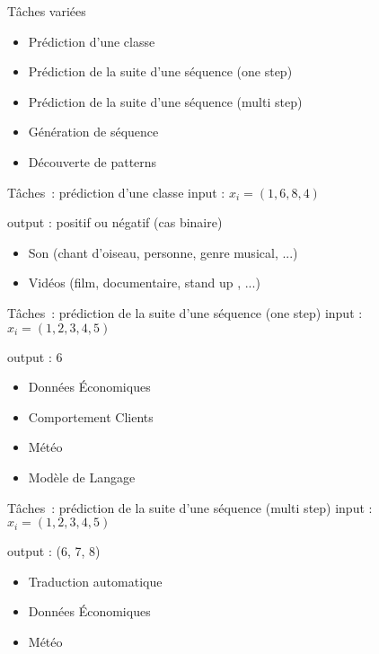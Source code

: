 \begin{frame}{Tâches variées}
  \begin{itemize}
  \item Prédiction d'une classe
  \item Prédiction de la suite d'une séquence (one step)
  \item Prédiction de la suite d'une séquence (multi step)
  \item Génération de séquence
  \item Découverte de patterns
  \end{itemize}
\end{frame}

\begin{frame}{Tâches~: prédiction d'une classe}
  input : $x_i=(1,6,8,4)$

  output : positif ou négatif (cas binaire)

  \begin{itemize}[<+->]
    \item Son (chant d'oiseau, personne, genre musical, ...)
    \item Vidéos (film, documentaire, stand up , ...)
  \end{itemize}
\end{frame}

\begin{frame}{Tâches~: prédiction de la suite d'une séquence (one step)}
  input : $x_i=(1,2,3,4,5)$

  output : 6

  \begin{itemize}[<+->]
    \item Données Économiques
    \item Comportement Clients
    \item Météo
    \item Modèle de Langage
  \end{itemize}
\end{frame}

\begin{frame}{Tâches~: prédiction de la suite d'une séquence (multi step)}
  input : $x_i=(1,2,3,4,5)$

  output : (6, 7, 8)

  \begin{itemize}[<+->]
    \item Traduction automatique
    \item Données Économiques
    \item Météo
  \end{itemize}
\end{frame}

